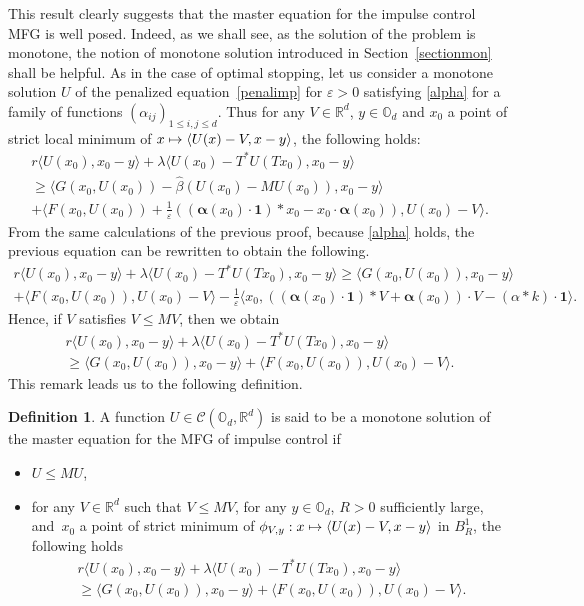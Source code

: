 \documentclass[10pt]{amsart}
\let\mathcal\mathscr
\newcommand\mto{\mathchoice{\longmapsto}{\mapsto}{\mapsto}{\mapsto}}
\newcommand{\One}{\mathbf{1}}
\let\epsilon\varepsilon
\theoremstyle{definition}
\newtheorem{Def}{Definition}[section]
\begin{document}
This result clearly suggests that the master equation for the impulse control MFG is well posed. Indeed, as we shall see, as the solution of the problem is monotone, the notion of monotone solution introduced in Section~\ref{sectionmon} shall be helpful. As in the case of optimal stopping, let us consider a monotone solution $U$ of the penalized equation~\eqref{penalimp} for $\epsilon > 0$ satisfying \eqref{alpha} for a family of functions $(\alpha_{ij})_{1\leq i,j\leq d}$. Thus for any $V \in \mathbb{R}^d$, $y \in \mathbb{O}_d$ and $x_0$ a point of strict local minimum of $ x \mto \langle U(x)-V, x-y\rangle$, the following holds:\vspace*{-5pt}
\begin{multline*}
r\langle U(x_0), x_0-y\rangle + \lambda \langle U(x_0)-T^*U(Tx_0),x_0-y\rangle\\
\geq \langle G(x_0,U(x_0))-\hat{\beta}(U(x_0)-MU(x_0)), x_0-y \rangle\\
+ \langle F(x_0,U(x_0))+\frac{1}{\epsilon} ((\boldsymbol{\alpha}(x_0)\cdot\One)* x_0-x_0\cdot \boldsymbol{\alpha}(x_0)), U(x_0)-V\rangle.
\end{multline*}
From the same calculations of the previous proof, because \eqref{alpha} holds, the previous equation can be rewritten to obtain the following.\vspace*{-5pt}
\begin{multline*}
r\langle U(x_0), x_0-y\rangle+\lambda \langle U(x_0)-T^*U(Tx_0),x_0-y\rangle\geq \langle G(x_0,U(x_0)), x_0-y \rangle\\
+ \langle F(x_0,U(x_0)), U(x_0)-V\rangle-\frac{1}{\epsilon}\langle x_0, ((\boldsymbol{\alpha}(x_0)\cdot\One)* V+\boldsymbol{\alpha}(x_0))\cdot V-(\alpha*k)\cdot \One\rangle.
\end{multline*}
Hence, if $V$ satisfies $V \leq MV$, then we obtain\vspace*{-5pt}
\begin{multline*}
r\langle U(x_0), x_0-y\rangle + \lambda \langle U(x_0)-T^*U(Tx_0),x_0-y\rangle \\
\geq
\langle G(x_0,U(x_0)), x_0-y \rangle+\langle F(x_0,U(x_0)), U(x_0)-V\rangle.
\end{multline*}
This remark leads us to the following definition.
\begin{Def}\label{defmonimp}
A function $U \in \mathcal{C}(\mathbb{O}_d, \mathbb{R}^d)$ is said to be a monotone solution of the master equation for the MFG of impulse control if
\begin{itemize}
\item $U \leq MU$,
\item for any $V \in \mathbb{R}^d$ such that $V \leq MV$, for any $y \in \mathbb{O}_d$, $R>0$ sufficiently large, and~$x_0$ a point of strict minimum of $\phi_{V,y}: x \mto \langle U(x)-V, x-y\rangle$ in $B^1_R$, the following holds\vspace*{-5pt}
\begin{multline*}
r\langle U(x_0), x_0-y\rangle + \lambda \langle U(x_0)-T^*U(Tx_0),x_0-y\rangle \\
\geq
\langle G(x_0,U(x_0)), x_0-y \rangle+\langle F(x_0,U(x_0)), U(x_0)-V\rangle.
\end{multline*}
\end{itemize}
\end{Def}
\end{document}
